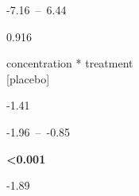 \documentclass[
  letterpaper,
  DIV=11,
  numbers=noendperiod]{scrartcl}
\begin{document}
\begin{table}
\begin{minipage}[t]{\linewidth}
\end{minipage}%
\newline
\begin{minipage}[t]{\linewidth}

{\centering 

-7.16~--~6.44

}

\end{minipage}%
\newline
\begin{minipage}[t]{\linewidth}

{\centering 

0.916

}

\end{minipage}%
\newline
\begin{minipage}[t]{\linewidth}

{\centering 

concentration * treatment\\
{[}placebo{]}

}

\end{minipage}%
\newline
\begin{minipage}[t]{\linewidth}

{\centering 

-1.41

}

\end{minipage}%
\newline
\begin{minipage}[t]{\linewidth}

{\centering 

-1.96~--~-0.85

}

\end{minipage}%
\newline
\begin{minipage}[t]{\linewidth}

{\centering 

\textbf{\textless0.001}

}

\end{minipage}%
\newline
\begin{minipage}[t]{\linewidth}

{\centering 

-1.89

}
\end{minipage}
\end{table}
\end{document}
